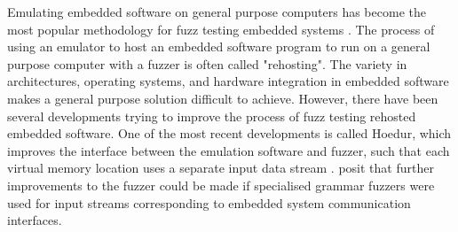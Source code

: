 \documentclass[../report.tex]{subfiles}
\begin{document}
Emulating embedded software on general purpose computers has become the most
popular methodology for fuzz testing embedded systems \citep{Yun_2022}. The
process of using an emulator to host an embedded software program to run on a
general purpose computer with a fuzzer is often called "rehosting". The variety
in architectures, operating systems, and hardware integration in embedded
software makes a general purpose solution difficult to achieve. However, there
have been several developments trying to improve the process of fuzz testing
rehosted embedded software. One of the most recent developments is called
Hoedur, which improves the interface between the emulation software and fuzzer,
such that each virtual memory location uses a separate input data stream
\citep{Hoedur_2023}. \citet{Hoedur_2023} posit that further improvements to the
fuzzer could be made if specialised grammar fuzzers were used for input streams
corresponding to embedded system communication interfaces.
\end{document}
